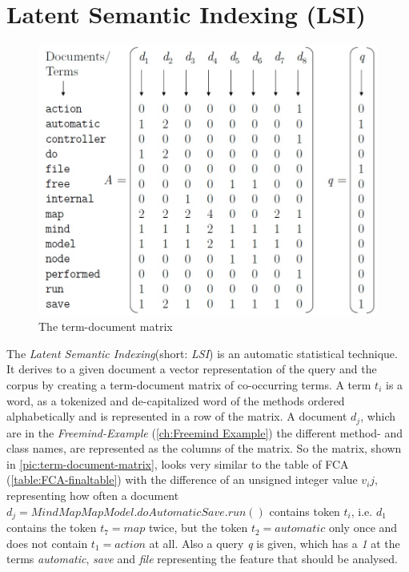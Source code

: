 \section{Latent Semantic Indexing (LSI)}
\label{sec:LSI}
\begin{figure}
  \centering
  \includegraphics[width=\linewidth]{src/pic/term_document_matrix}
  \caption{The term-document matrix}
  \label{pic:term-document-matrix}
\end{figure}
The \emph{Latent Semantic Indexing}(short: \emph{LSI}) is an automatic statistical technique. It derives to a given document a vector representation of the query and the corpus by creating a term-document matrix of co-occurring terms. A term $t_i$ is a word, as a tokenized and de-capitalized word of the methods ordered alphabetically and is represented in a row of the matrix. A document $d_j$, which are in the \textit{Freemind-Example} (\autoref{ch:Freemind Example}) the different method- and class names, are represented as the columns of the matrix. So the matrix, shown in \autoref{pic:term-document-matrix}, looks very similar to the table of FCA (\autoref{table:FCA-finaltable}) with the difference of an unsigned integer value $v_ij$, representing how often a document $d_j=MindMapMapModel.doAutomaticSave.run()$ contains token $t_i$, i.e. $d_1$ contains the token $t_7=map$ twice, but the token $t_2=automatic$ only once and does not contain $t_1=action$ at all. Also a query \emph{q} is given, which has a \emph{1} at the terms \emph{automatic}, \emph{save} and \emph{file} representing the feature that should be analysed. 

